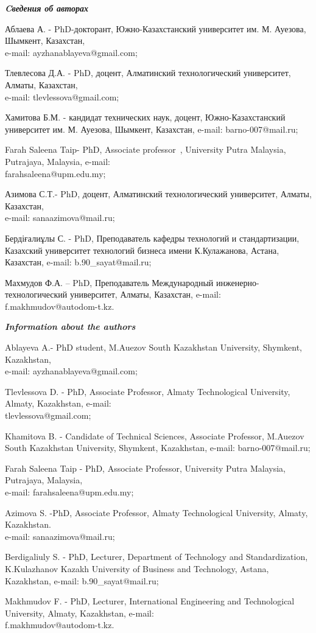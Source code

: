 \begin{authorinfo}
\emph{{\bfseries Cведения об авторах}}

Аблаева А. - PhD-докторант, Южно-Казахстанский университет им. М.
Ауезова, Шымкент, Казахстан,\\ e-mail: ayzhanablayeva@gmail.com;

Тлевлесова Д.А. - PhD, доцент, Алматинский технологический университет,
Алматы, Казахстан,\\ e-mail: tlevlessova@gmail.com;

Хамитова Б.М. - кандидат технических наук, доцент, Южно-Казахстанский
университет им. М. Ауезова, Шымкент, Казахстан, e-mail: barno-007@mail.ru;

Farah Saleena Taip- PhD, Associate professor~, University Putra
Malaysia, Putrajaya, Malaysia, e-mail: \\farahsaleena@upm.edu.my;

Азимова С.Т.- PhD, доцент, Алматинский технологический университет,
Алматы, Казахстан,\\ e-mail: sanaazimova@mail.ru;

Бердіғалиұлы С. - PhD, Преподаватель кафедры технологий и
стандартизации, Казахский университет технологий бизнеса имени
К.Кулажанова, Астана, Казахстан, e-mail: b.90\_sayat@mail.ru;

Махмудов Ф.А. -- PhD, Преподаватель Международный
инженерно-технологический университет, Алматы,
Казахстан, e-mail: f.makhmudov@autodom-t.kz.

\emph{{\bfseries Information about the authors}}

Ablayeva A.- PhD student, M.Auezov South Kazakhstan University,
Shymkent, Kazakhstan,\\ e-mail: ayzhanablayeva@gmail.com;

Tlevlessova D. - PhD, Associate Professor, Almaty Technological
University, Almaty, Kazakhstan, e-mail: \\tlevlessova@gmail.com;

Khamitova B. - Candidate of Technical Sciences, Associate Professor,
M.Auezov South Kazakhstan University, Shymkent, Kazakhstan, e-mail:
barno-007@mail.ru;

Farah Saleena Taip - PhD, Associate Professor, University Putra
Malaysia, Putrajaya, Malaysia,\\ e-mail: farahsaleena@upm.edu.my;

Azimova S. -PhD, Associate Professor, Almaty Technological University,
Almaty, Kazakhstan.\\ e-mail: sanaazimova@mail.ru;

Berdigaliuly S. - PhD, Lecturer, Department of Technology and
Standardization, K.Kulazhanov Kazakh University of Business and
Technology, Astana, Kazakhstan, e-mail: b.90\_sayat@mail.ru;

Makhmudov F. - PhD, Lecturer, International Engineering and
Technological University, Almaty, Kazakhstan, e-mail: \\f.makhmudov@autodom-t.kz.
\end{authorinfo}
